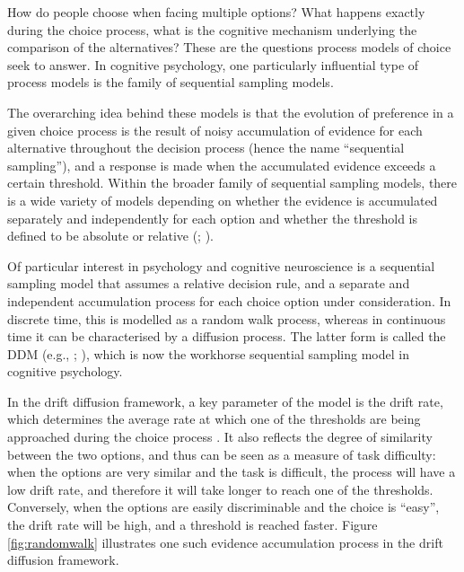 \documentclass[11pt,a4paper]{article}
\begin{document}
How do people choose when facing multiple options? What happens exactly during the choice process, what is the cognitive mechanism underlying the comparison of the alternatives? These are the questions process models of choice seek to answer. In cognitive psychology, one particularly influential type of process models is the family of sequential sampling models. 

The overarching idea behind these models is that the evolution of preference in a given choice process is the result of noisy accumulation of evidence for each alternative throughout the decision process (hence the name “sequential sampling”), and a response is made when the accumulated evidence exceeds a certain threshold. Within the broader family of sequential sampling models, there is a wide variety of models depending on whether the evidence is accumulated separately and independently for each option and whether the threshold is defined to be absolute or relative (; ).

Of particular interest in psychology and cognitive neuroscience is a sequential sampling model that assumes a relative decision rule, and a separate and independent accumulation process for each choice option under consideration. In discrete time, this is modelled as a random walk process, whereas in continuous time it can be characterised by a diffusion process. The latter form is called the DDM (e.g., ; ), which is now the workhorse sequential sampling model in cognitive psychology. 

In the drift diffusion framework, a key parameter of the model is the drift rate, which determines the average rate at which one of the thresholds are being approached during the choice process \cite{Voss2004a}. It also reflects the degree of similarity between the two options, and thus can be seen as a measure of task difficulty: when the options are very similar and the task is difficult, the process will have a low drift rate, and therefore it will take longer to reach one of the thresholds. Conversely, when the options are easily discriminable and the choice is ``easy'', the drift rate will be high, and a threshold is reached faster. Figure \ref{fig:randomwalk} illustrates one such evidence accumulation process in the drift diffusion framework.
\end{document}
